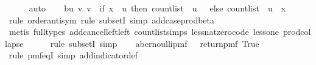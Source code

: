 \begin{isabellebody}
\ \ \ \ \isamarkupfalse%
\ auto\isanewline
\ \ \isamarkupfalse%
\ b{\isacharcolon}{\kern0pt}{\isachardoublequoteopen}{\isacharbraceleft}{\kern0pt}{\isacharparenleft}{\kern0pt}u{\isacharcomma}{\kern0pt}\ v{\isacharparenright}{\kern0pt}{\isachardot}{\kern0pt}\ v\ {\isacharless}{\kern0pt}\ {\isacharparenleft}{\kern0pt}if\ x\ {\isacharequal}{\kern0pt}\ u\ then\ count{\isacharunderscore}{\kern0pt}list\ {\isacharbrackleft}{\kern0pt}{\isacharbrackright}{\kern0pt}\ u\ {\isacharplus}{\kern0pt}\ {}\ else\ count{\isacharunderscore}{\kern0pt}list\ {\isacharbrackleft}{\kern0pt}{\isacharbrackright}{\kern0pt}\ u{\isacharparenright}{\kern0pt}{\isacharbraceright}{\kern0pt}\ {\isacharequal}{\kern0pt}\ {\isacharbraceleft}{\kern0pt}{\isacharparenleft}{\kern0pt}x{\isacharcomma}{\kern0pt}{}{\isacharparenright}{\kern0pt}{\isacharbraceright}{\kern0pt}{\isachardoublequoteclose}\isanewline
\ \ \ \ \isamarkupfalse%
\ {\isacharparenleft}{\kern0pt}rule\ order{\isacharunderscore}{\kern0pt}antisym{\isacharcomma}{\kern0pt}\ rule\ subsetI{\isacharcomma}{\kern0pt}\ simp\ add{\isacharcolon}{\kern0pt}case{\isacharunderscore}{\kern0pt}prod{\isacharunderscore}{\kern0pt}beta{\isacharparenright}{\kern0pt}\ \isanewline
\ \ \ \ \ \isamarkupfalse%
\ {\isacharparenleft}{\kern0pt}metis\ {\isacharparenleft}{\kern0pt}full{\isacharunderscore}{\kern0pt}types{\isacharparenright}{\kern0pt}\ add{\isacharunderscore}{\kern0pt}cancel{\isacharunderscore}{\kern0pt}left{\isacharunderscore}{\kern0pt}left\ count{\isacharunderscore}{\kern0pt}list{\isachardot}{\kern0pt}simps{\isacharparenleft}{\kern0pt}{}{\isacharparenright}{\kern0pt}\ less{\isacharunderscore}{\kern0pt}nat{\isacharunderscore}{\kern0pt}zero{\isacharunderscore}{\kern0pt}code\ less{\isacharunderscore}{\kern0pt}one\ prod{\isachardot}{\kern0pt}collapse{\isacharparenright}{\kern0pt}\isanewline
\ \ \ \ \isamarkupfalse%
\ {\isacharparenleft}{\kern0pt}rule\ subsetI{\isacharcomma}{\kern0pt}\ simp{\isacharparenright}{\kern0pt}\isanewline
\ \ \isamarkupfalse%
\ a{\isacharcolon}{\kern0pt}{\isachardoublequoteopen}bernoulli{\isacharunderscore}{\kern0pt}pmf\ {}\ {\isacharequal}{\kern0pt}\ return{\isacharunderscore}{\kern0pt}pmf\ True{\isachardoublequoteclose}\isanewline
\ \ \ \ \isamarkupfalse%
\ {\isacharparenleft}{\kern0pt}rule\ pmf{\isacharunderscore}{\kern0pt}eqI{\isacharcomma}{\kern0pt}\ simp\ add{\isacharcolon}{\kern0pt}indicator{\isacharunderscore}{\kern0pt}def{\isacharparenright}{\kern0pt}\isanewline

\end{isabellebody}

